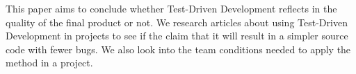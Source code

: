 This paper aims to conclude whether Test-Driven Development reflects in the quality of the final product or not. We research articles about using Test-Driven Development in projects to see if the claim that it will result in a simpler source code with fewer bugs. We also look into the team conditions needed to apply the method in a project.